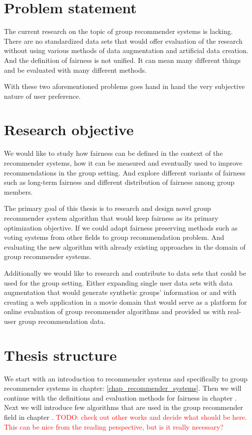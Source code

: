 \section{Problem statement}
The current research on the topic of group recommender systems is lacking. There are no standardized data sets that would offer evaluation of the research without using various methods of data augmentation and artificial data creation.
And the definition of fairness is not unified. It can mean many different things and be evaluated with many different methods.

With these two aforementioned problems goes hand in hand the very subjective nature of user preference.

\section{Research objective}

We would like to study how fairness can be defined in the context of the recommender systems, how it can be measured and eventually used to improve recommendations in the group setting. And explore different variants of fairness such as long-term fairness and different distribution of fairness among group members. 

The primary goal of this thesis is to research and design novel group recommender system algorithm that would keep fairness as its primary optimization objective. If we could adapt fairness preserving methods such as voting systems from other fields to group recommendation problem. And evaluating the new algorithm with already existing approaches in the domain of group recommender systems.

Additionally we would like to research and contribute to data sets that could be used for the group setting. Either expanding single user data sets with data augmentation that would generate synthetic groups' information or and with creating a web application in a movie domain that would serve as a platform for online evaluation of group recommender algorithms and provided us with real-user group recommendation data.

\section{Thesis structure}

We start with an introduction to recommender systems and specifically to group recommender systems in chapter: \ref{chap_recommender_systems}. Then we will continue with the definitions and evaluation methods for fairness in chapter . Next we will introduce few algorithms that are used in the group recommender field in chapter .
\textcolor{red}{TODO: check out other works and decide what should be here. This can be nice from the reading perspective, but is it really necessary?}


